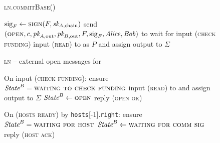 \begin{figure}[H]
  \begin{processbox}{\textsc{ln.commitBase}()}
    \begin{algorithmic}[1]
      \State $\mathrm{sig}_F \gets \textsc{sign}(F, \textit{sk}_{A, \mathrm{chain}})$
      \label{code:ln:base:sign-funding}
      \State send $(\textsc{open}, c, \textit{pk}_{A, \mathrm{out}}, \textit{pk}_{B,
      \mathrm{out}}, F, \mathrm{sig}_F, \mathit{Alice}, \mathit{Bob})$ to \adversary
        \State wait for input (\textsc{check funding}) 
        \State input (\textsc{read}) to \ledger as $P$ and assign output to
        $\Sigma$
      \EndWhile
    \end{algorithmic}
  \end{processbox}
  \caption{}
  \label{code:ln:commit-base}
\end{figure}

\begin{figure}[H]
  \begin{processbox}{\textsc{ln} -- external open messages for \bob}
    \begin{algorithmic}[1]
      \State On input (\textsc{check funding}): 
      \Indent
        \State ensure $\textit{State}^B = \textsc{waiting to check funding}$
        \State input (\textsc{read}) to \ledger and assign output to $\Sigma$
          \State $\textit{State}^B \gets \textsc{open}$
          \State reply (\textsc{open ok})
        \EndIf
      \EndIndent
      \Statex

      \State On (\textsc{hosts ready}) by \texttt{hosts}[-1].\texttt{right}:
      \Indent
        \State ensure $\textit{State}^B = \textsc{waiting for host}$
        \State $\textit{State}^B \gets \textsc{waiting for comm sig}$
        \label{code:ln:bob:host}
        \State reply (\textsc{host ack})
      \EndIndent
    \end{algorithmic}
  \end{processbox}
  \caption{}
  \label{code:ln:bob}
\end{figure}

